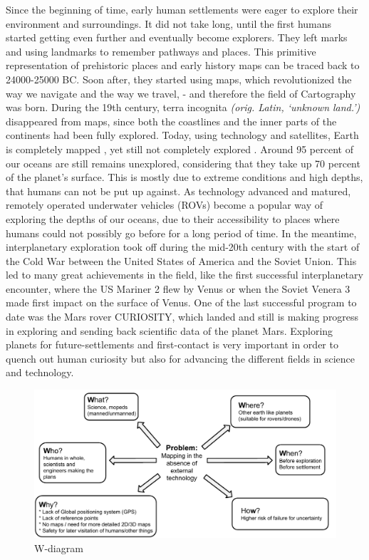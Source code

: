 Since the beginning of time, early human settlements were eager to explore their environment and surroundings. It did not take long, until the first humans started getting even further and eventually become explorers. They left marks and using landmarks to remember pathways and places. This primitive representation of prehistoric places and early history maps can be traced back to 24000-25000 BC\cite{cavedrawings}. Soon after, they started using maps, which revolutionized the way we navigate and the way we travel, - and therefore the field of Cartography was born. During the 19th century, terra incognita \textit{(orig. Latin, ‘unknown land.’)} disappeared from maps, since both the coastlines and the inner parts of the continents had been fully explored. Today, using technology and satellites, Earth is completely mapped %
, yet still not completely explored %
. Around 95 percent of our oceans are still remains unexplored, considering that they take up 70 percent of the planet's surface\cite{oceandepth}. This is mostly due to extreme conditions and high depths, that humans can not be put up against. As technology advanced and matured, remotely operated underwater vehicles (ROVs) become a popular way of exploring the depths of our oceans, due to their accessibility to places where humans could not possibly go before for a long period of time. In the meantime, interplanetary exploration took off during the mid-20th century with the start of the Cold War between the United States of America and the Soviet Union. This led to many great achievements in the field, like the first successful interplanetary encounter, where the US Mariner 2 flew by Venus\cite{firstflyby} or when the Soviet Venera 3 made first impact on the surface of Venus\cite{firstimpact}. One of the last successful program to date was the Mars rover CURIOSITY, which landed and still is making progress in exploring and sending back scientific data of the planet Mars. Exploring planets for future-settlements and first-contact is very important in order to quench out human curiosity but also for advancing the different fields in science and technology.

\clearpage

\begin{figure}[!h]
	\centering
	\includegraphics[scale=.7]{images/wdiagram1.pdf}
	\caption{W-diagram}
	\label{fig:wdiagram}
\end{figure}

